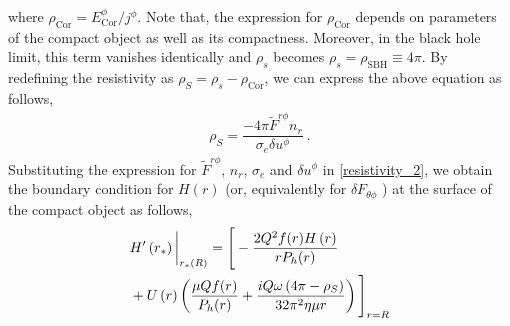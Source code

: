 \documentclass[aps,prd,twocolumn,floatfix,noshowpacs,tightenlines,noshowkeys,superscriptaddress,amsmath,amssymb,
nofootinbib]{revtex4-1}
\renewcommand\[{\begin{equation}}
\renewcommand\]{\end{equation}}
\begin{document}
where $\rho_{\textrm{Cor}}={E}^\phi_{\textrm{Cor}}/j^\phi$. Note that, the expression for $\rho_{\textrm{Cor}}$ depends on parameters of the compact object as well as its compactness. Moreover, in the black hole limit, this term vanishes identically and $\rho_{s}$ becomes $\rho_{s}=\rho_{\textrm{SBH}}\equiv 4\pi$. By redefining the resistivity as $\rho_{S}=\rho_{s}-\rho_{\textrm{Cor}}$, we can express the above equation as follows,
\begin{equation}\label{resistivity_2}
	\begin{aligned}
		\rho_{S}=\dfrac{-4\pi \tilde{F}^{r\phi}n_r}{\sigma_{e} \delta u^\phi}~.
	\end{aligned}
\end{equation}
Substituting the expression for $\tilde{F}^{r\phi}$, $n_r$, $\sigma_{e}$ and $\delta u^\phi$ in \autoref{resistivity_2}, we obtain the boundary condition for $ H(r) $ (or, equivalently for $\delta F_{\theta\phi}$  ) at the surface of the compact object as follows,
\begin{equation}\label{em_pert}
\begin{aligned}
&H'\left(r_*\right)\bigg{|}_{r_*(R)}=\Bigg[-\frac{2 Q^2 f(r) H\left(r\right)}{r P_h(r)}\\&+U\left(r\right) \left(\frac{\mu  Q f(r)}{P_h(r)}+\frac{i Q \omega  \left(4 \pi -\rho _S\right)}{32 \pi ^2 \eta  \mu  r}\right)\Bigg]_{r=R}
\end{aligned}
\end{equation}
\end{document}
